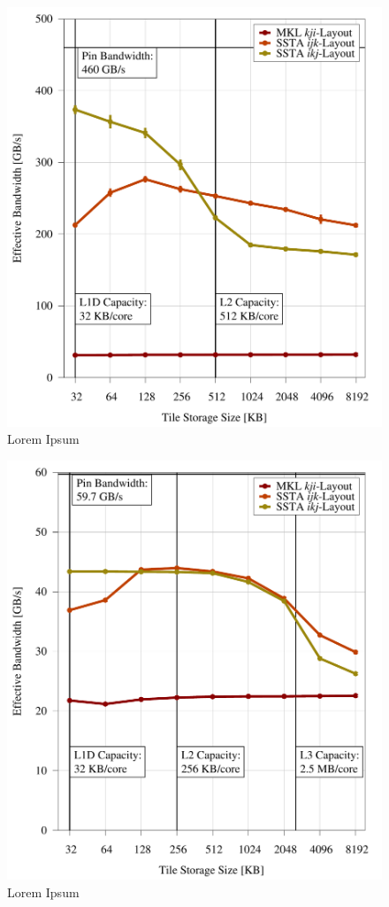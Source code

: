 \documentclass{sig-alternate-05-2015}
\begin{document}
\begin{figure}%
    \centering
    \label{fig:r0}
    \caption{Lorem Ipsum}
    \includegraphics[width=0.95\columnwidth]{figures/post_tsb_tw_sweep_full_matrix_double_precision_production_carl_knl_7210_09_02_2016_64pus.pdf}
\end{figure}

\begin{figure}%
    \centering
    \label{fig:r0}
    \caption{Lorem Ipsum}
    \includegraphics[width=0.95\columnwidth]{figures/post_tsb_tw_sweep_full_matrix_double_precision_production_edison_ivb_e5_2695_v2_08_31_2016_09_03_2016_12pus.pdf}
\end{figure}
\end{document}
